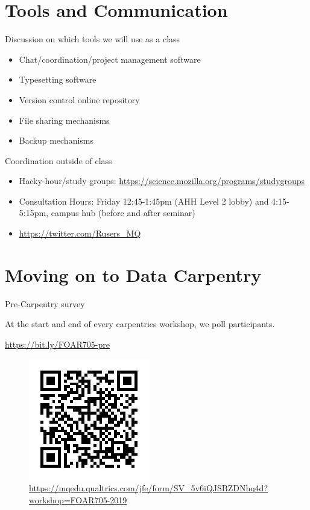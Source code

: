 \documentclass[aspectratio=169, 11pt]{beamer} %
\begin{document}
\section{Tools and Communication}
\begin{frame}{Discussion on which tools we will use as a class}

\begin{itemize}[label=\textbullet]
    \item Chat/coordination/project management software
    \item Typesetting software
    \item Version control online repository
    \item File sharing mechanisms
    \item Backup mechanisms
\end{itemize}

\end{frame}
\begin{frame}{Coordination outside of class}

\begin{itemize}[label=\textbullet]
    \item Hacky-hour/study groups: \url{https://science.mozilla.org/programs/studygroups}
    \item Consultation Hours: Friday 12:45-1:45pm (AHH Level 2 lobby) and 4:15-5:15pm, campus hub (before and after seminar)
    \item \url{https://twitter.com/Rusers_MQ}
\end{itemize}

\end{frame}



\section{Moving on to Data Carpentry}


\begin{frame}{Pre-Carpentry survey}

At the start and end of every carpentries workshop, we poll participants.

\url{https://bit.ly/FOAR705-pre}

\begin{figure}[H]
        \centering
        \includegraphics[height=.6\textheight]{figures/qr.jpeg}
        \caption{\url{https://mqedu.qualtrics.com/jfe/form/SV_5v6iQJSBZDNhq4d?workshop=FOAR705-2019}}
        \label{fig:foarqr}
    \end{figure}
    
\end{frame}
\end{document}
